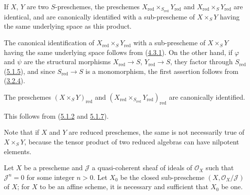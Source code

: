 \begin{proposition}[5.1.7]
\label{I.5.1.7}
If $X$, $Y$ are two $S$-preschemes, the preschemes
$X_{\mathrm{red}}\times_{S_{\mathrm{red}}}Y_{\mathrm{red}}$ and
$X_{\mathrm{red}}\times_S Y_{\mathrm{red}}$ are identical, and
are canonically identified with a sub-prescheme of $X\times_S Y$ having the
same underlying space as this product.
\end{proposition}

The canonical identification of $X_{\mathrm{red}}\times_S Y_{\mathrm{red}}$
with a sub-prescheme of $X\times_S Y$ having the same underlying space follows
from (\hyperref[I.4.3.1]{4.3.1}). On the other hand, if $\varphi$ and
$\psi$ are the structural morphisms $X_{\mathrm{red}}\to S$,
$Y_{\mathrm{red}}\to S$, they factor through $S_{\mathrm{red}}$
(\hyperref[I.5.1.5]{5.1.5}), and since $S_{\mathrm{red}}\to S$ is a
monomorphism, the first assertion follows from
(\hyperref[I.3.2.4]{3.2.4}).

\begin{corollary}[5.1.8]
\label{I.5.1.8}
The preschemes $(X\times_S Y)_{\mathrm{red}}$ and
$(X_{\mathrm{red}}\times_{S_{\mathrm{red}}}Y_{\mathrm{red}})_{\mathrm{red}}$
are canonically identified.
\end{corollary}

This follows from (\hyperref[I.5.1.2]{5.1.2} and
\hyperref[I.5.1.7]{5.1.7}).

Note that if $X$ and $Y$ are reduced preschemes, the same is not
necessarily true of $X\times_S Y$, because the tensor product of two
reduced algebras can have nilpotent elements.

\begin{proposition}[5.1.9]
\label{I.5.1.9}
Let $X$ be a prescheme and $\mathscr{J}$ a quasi-coherent sheaf of ideals of
$\mathscr{O}_X$ such that $\mathscr{J}^n=0$ for some integer $n>0$. Let $X_0$
be the closed sub-prescheme $(X,\mathscr{O}_X/\mathscr{J})$ of $X$; for $X$
to be an affine scheme, it is necessary and sufficient that $X_0$ be one.
\end{proposition}

